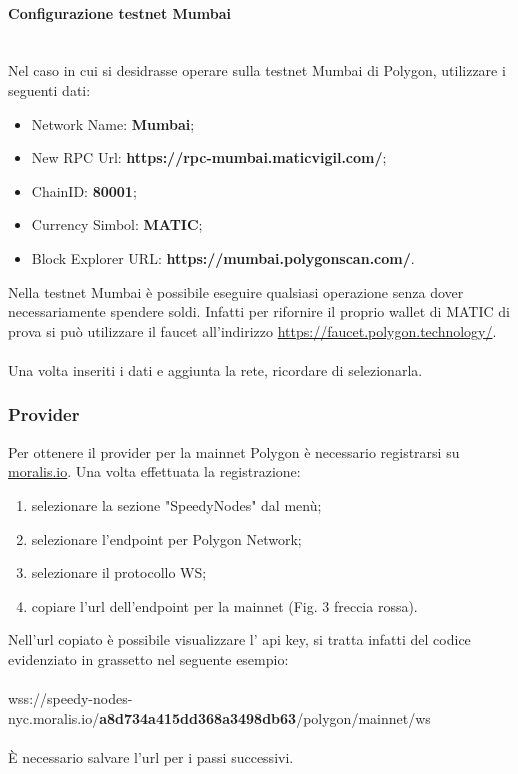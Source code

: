 \documentclass[a4paper, 12pt]{article}
\begin{document}
\paragraph{Configurazione testnet Mumbai}\\
Nel caso in cui si desidrasse operare sulla testnet Mumbai di Polygon, utilizzare i seguenti dati:
\begin{itemize}
\item Network Name: \textbf{Mumbai};
\item New RPC Url: \textbf{https://rpc-mumbai.maticvigil.com/};
\item ChainID: \textbf{80001};
\item Currency Simbol: \textbf{MATIC};
\item Block Explorer URL: \textbf{https://mumbai.polygonscan.com/}.
\end{itemize}
Nella testnet Mumbai è possibile eseguire qualsiasi operazione senza dover necessariamente spendere soldi. Infatti per rifornire il proprio wallet di MATIC di prova si può utilizzare il faucet all'indirizzo \url{https://faucet.polygon.technology/}.\\ \\
Una volta inseriti i dati e aggiunta la rete, ricordare di selezionarla.
\subsubsection{Provider}
\label{sec:provider}
Per ottenere il provider per la mainnet Polygon è necessario registrarsi su \href{https://www.moralis.io}{moralis.io}. Una volta effettuata la registrazione:
\begin{enumerate}
  \item selezionare la sezione "SpeedyNodes" dal menù;
  \item selezionare l'endpoint per Polygon Network;
  \item selezionare il protocollo WS;
  \item copiare l'url dell'endpoint per la mainnet (Fig. 3 freccia rossa).
\end{enumerate}
Nell'url copiato è possibile visualizzare l' api key, si tratta infatti del codice evidenziato in grassetto nel seguente esempio:\\\\
wss://speedy-nodes-nyc.moralis.io/\textbf{a8d734a415dd368a3498db63}/polygon/mainnet/ws\\\\
È necessario salvare l'url per i passi successivi.
\end{document}
